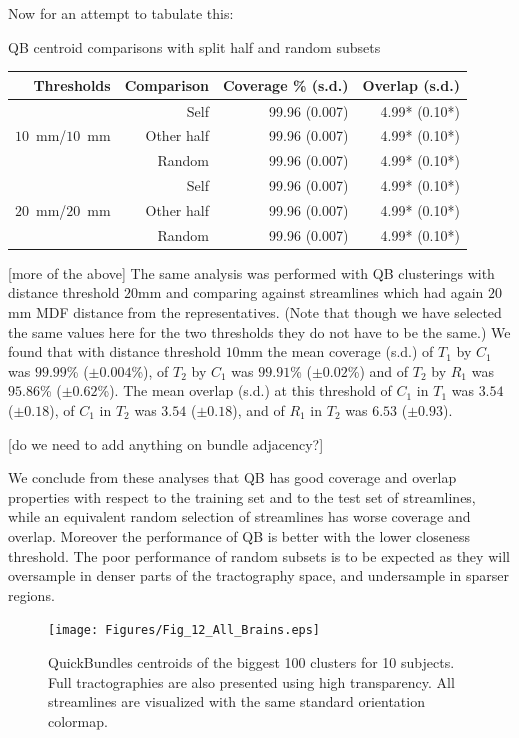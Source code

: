 \documentclass{bioinfo}
\begin{document}
Now for an attempt to tabulate this:

\begin{table}[th]{QB centroid comparisons with split half and random subsets}
\begin{tabular}{rrrr}
\hline
Thresholds & Comparison & Coverage \% (s.d.) & Overlap (s.d.) \\
\hline
\multirow{3}{*}{$10$~mm/$10$~mm} & Self & 99.96 (0.007) & 4.99* (0.10*)\\   
& Other half & 99.96 (0.007) & 4.99* (0.10*)\\   
& Random & 99.96 (0.007) & 4.99* (0.10*)\\   
\hline
\multirow{3}{*}{$20$~mm/$20$~mm} & Self & 99.96 (0.007) & 4.99* (0.10*)\\   
& Other half & 99.96 (0.007) & 4.99* (0.10*)\\
& Random & 99.96 (0.007) & 4.99* (0.10*)\\   
\hline   
\end{tabular}
\end{table}

[more of the above] The same analysis was performed with QB clusterings
with distance threshold $20$mm and comparing against streamlines which
had again $20$mm MDF distance from the representatives. (Note that
though we have selected the same values here for the two thresholds they
do not have to be the same.) We found that with distance threshold
$10$mm the mean coverage (s.d.) of $T_1$ by $C_1$ was $99.99$\% ($\pm
0.004$\%), of $T_2$ by $C_1$ was $99.91$\% ($\pm 0.02$\%) and of $T_2$
by $R_1$ was $95.86$\% ($\pm 0.62$\%). The mean overlap (s.d.) at this
threshold of $C_1$ in $T_1$ was $3.54$ ($\pm 0.18$), of $C_1$ in $T_2$
was $3.54$ ($\pm 0.18$), and of $R_1$ in $T_2$ was $6.53$ ($\pm 0.93$).

[do we need to add anything on bundle adjacency?]

We conclude from these analyses that QB has good coverage and overlap
properties with respect to the training set and to the test set of
streamlines, while an equivalent random selection of streamlines has
worse coverage and overlap. Moreover the performance of QB is better
with the lower closeness threshold. The poor performance of random
subsets is to be expected as they will oversample in denser parts of the
tractography space, and undersample in sparser regions.

\begin{figure}[htp]
  \centerline{\texttt{[image: Figures/Fig\_12\_All\_Brains.eps]}}
  \caption{QuickBundles centroids of the biggest 100 clusters for 10
    subjects. Full tractographies are also presented using high
    transparency. All streamlines are visualized with the same standard
    orientation colormap. \label{Flo:BAs}}
\end{figure}
\end{document}

